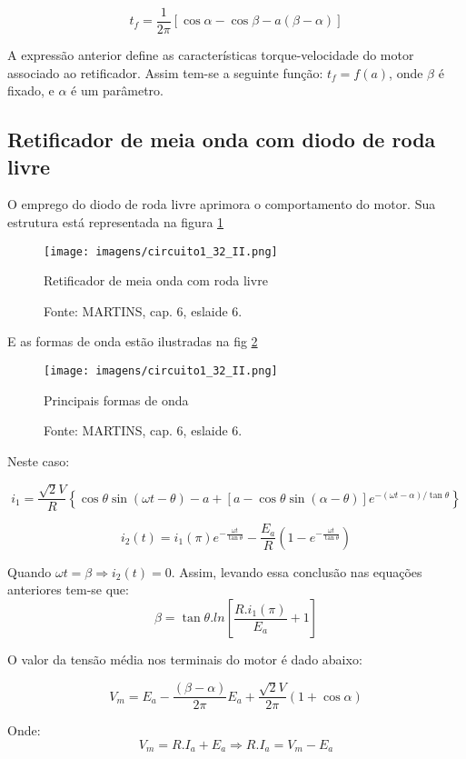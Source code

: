 \[t_{f} = \frac{1}{2\pi}\left[\cos{\alpha} - \cos{\beta} - a\left(\beta - \alpha\right)\right]\]

A expressão anterior define as características torque-velocidade do motor associado ao retificador. Assim tem-se a seguinte função: $t_{f} = f(a)$, onde $\beta$ é fixado, e $\alpha$ é um parâmetro.

\subsection{Retificador de meia onda com diodo de roda livre}

O emprego do diodo de roda livre aprimora o comportamento do motor. Sua estrutura está representada na figura \ref{fig:C1-32-II}

\begin{figure}[ht!]
\center
\texttt{[image: imagens/circuito1\_32\_II.png]}
\caption{\label{fig:C1-32-II} Retificador de meia onda com roda livre}
\caption*{Fonte: MARTINS, cap. 6, eslaide 6.}
\end{figure}

E as formas de onda estão ilustradas na fig \ref{fig:C1-32-III}

\begin{figure}[ht!]
\center
\texttt{[image: imagens/circuito1\_32\_II.png]}
\caption{\label{fig:C1-32-III} Principais formas de onda}
\caption*{Fonte: MARTINS, cap. 6, eslaide 6.}
\end{figure}

Neste caso:

\[i_{1} = \frac{\sqrt{2}V}{R}\left\{\cos{\theta}\sin\left(\omega{t} - \theta\right) - a + \left[a - \cos{\theta}\sin{\left(\alpha - \theta\right)}\right]e^{-\left(\omega{t} - \alpha\right)/\tan{\theta}}\right\}\]

\[i_{2}(t) = i_{1}(\pi)e^{-\frac{\omega{t}}{\tan{\theta}}} - \frac{E_{a}}{R}\left(1 - e^{-\frac{\omega{t}}{\tan{\theta}}}\right)\]

Quando $\omega{t} = \beta \Rightarrow i_{2}(t) = 0$. Assim, levando essa conclusão nas equações anteriores tem-se que:
\[\beta = \tan{\theta}.ln\left[\frac{R.i_{1}(\pi)}{E_{a}} + 1\right]\]

O valor da tensão média nos terminais do motor é dado abaixo:

\[V_{m} = E_{a} - \frac{(\beta - \alpha)}{2\pi}E_{a} + \frac{\sqrt{2}V}{2\pi}\left(1 + \cos{\alpha}\right)\]

Onde:
\[V_{m} = R.I_{a} + E_{a} \Rightarrow R.I_{a} = V_{m} - E_{a}\]

